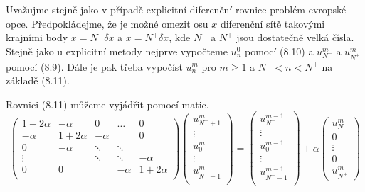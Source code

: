 \documentclass[a4paper]{book}
\begin{document}
Uvažujme stejně jako v případě explicitní diferenční rovnice problém evropské opce. Předpokládejme, že je možné  omezit osu $x$ diferenční sítě takovými krajními body $x = N^{-}\delta x$ a $x = N^{+}\delta x$, kde $N^{-}$ a $N^{+}$ jsou dostatečně velká čísla. Stejně jako u explicitní metody nejprve vypočteme $u_n^0$ pomocí (8.10) a $u_{N^{-}}^{m}$ a $u_{N^{+}}^{m}$ pomocí (8.9). Dále je pak třeba vypočíst $u_n^m$ pro $m \ge 1$ a $N^{-} < n < N^{+}$ na základě (8.11).

Rovnici (8.11) můžeme vyjádřit pomocí matic.
\begin{equation*}
	\begin{pmatrix}
		1 + 2 \alpha & - \alpha & 0 & \dots & 0 \\
		-\alpha & 1 + 2 \alpha & - \alpha & & 0\\
		0 & -\alpha & \ddots & \ddots & \\
		\vdots & & \ddots & \ddots & -\alpha \\
		0 & 0 & & -\alpha & 1 + 2 \alpha \\
		\end{pmatrix}
	\begin{pmatrix}
		u_{N^{-}+1}^m \\
		\vdots \\
		u_0^m \\
		\vdots \\
		u_{N^{+}-1}^m \\
	\end{pmatrix}
	=
	\begin{pmatrix}
		u_{N^{-}}^{m-1} \\
		\vdots \\
		u_0^{m-1} \\
		\vdots \\
		u_{N^{+}-1}^{m-1} \\
	\end{pmatrix}
	+
	\alpha
	\begin{pmatrix}
		u_{N^{-}}^m \\
		0 \\
		\vdots \\
		0 \\
		u_{N^{+}}^m
	\end{pmatrix}
\end{equation*}
\end{document}
